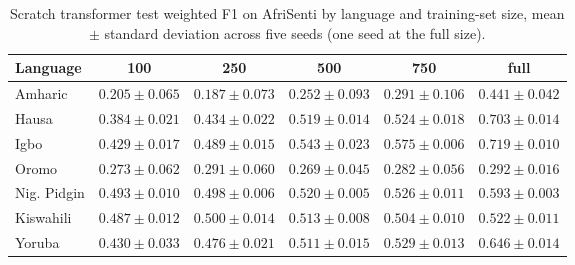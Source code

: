 \begin{table}[t]
\centering
\caption{Scratch transformer test weighted F1 on AfriSenti by language and training-set size, mean $\pm$ standard deviation across five seeds (one seed at the full size).}
\label{tab:scratch_main_results}
\small
\begin{tabular}{lccccc}
\toprule
Language & 100 & 250 & 500 & 750 & full \\
\midrule
Amharic & $0.205 \pm 0.065$ & $0.187 \pm 0.073$ & $0.252 \pm 0.093$ & $0.291 \pm 0.106$ & $0.441 \pm 0.042$ \\
Hausa & $0.384 \pm 0.021$ & $0.434 \pm 0.022$ & $0.519 \pm 0.014$ & $0.524 \pm 0.018$ & $0.703 \pm 0.014$ \\
Igbo & $0.429 \pm 0.017$ & $0.489 \pm 0.015$ & $0.543 \pm 0.023$ & $0.575 \pm 0.006$ & $0.719 \pm 0.010$ \\
Oromo & $0.273 \pm 0.062$ & $0.291 \pm 0.060$ & $0.269 \pm 0.045$ & $0.282 \pm 0.056$ & $0.292 \pm 0.016$ \\
Nig. Pidgin & $0.493 \pm 0.010$ & $0.498 \pm 0.006$ & $0.520 \pm 0.005$ & $0.526 \pm 0.011$ & $0.593 \pm 0.003$ \\
Kiswahili & $0.487 \pm 0.012$ & $0.500 \pm 0.014$ & $0.513 \pm 0.008$ & $0.504 \pm 0.010$ & $0.522 \pm 0.011$ \\
Yoruba & $0.430 \pm 0.033$ & $0.476 \pm 0.021$ & $0.511 \pm 0.015$ & $0.529 \pm 0.013$ & $0.646 \pm 0.014$ \\
\bottomrule
\end{tabular}
\end{table}